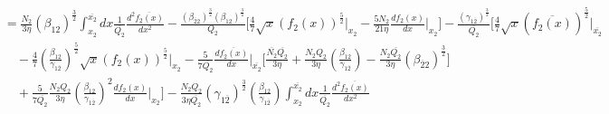 \documentclass[fleqn, 10pt]{article}
\begin{document}
                \begin{equation*}
                \begin{split}
                    &= \frac{N_2}{3 \eta} (\beta_{12})^\frac{3}{2} \int^{\overline{x_{2}}}_{x_2} dx \frac{1}{\overline{Q_{2}}} \frac{d^2\overline{f_{2}(x)}}{dx^2} -  \frac{(\beta_{\overline{2}2})^\frac{3}{2} (\beta_{12})^\frac{3}{2}}{Q_2} \Biggl[ \frac{4}{7} \sqrt{x} (f_2(x))^\frac{5}{2} \Bigg|_{x_2}  -   \frac{5 N_2}{21 \eta} \frac{df_2(x)}{dx} \Bigg|_{x_2} \Biggr] -   \frac{(\gamma_{1\overline{2}})^\frac{3}{2}}{\overline{Q_{2}}} \Biggl[ \frac{4}{7} \sqrt{x} (\overline{f_{2}(x)})^\frac{5}{2} \Bigg|_{\overline{x_{2}}} \\ & \quad -   \frac{4}{7} \left( \frac{\beta_{12}}{\gamma_{1\overline{2}}}\right)^\frac{5}{2} \sqrt{x} (f_2(x))^\frac{5}{2} \Bigg|_{x_2} -  \frac{5}{7\overline{Q_{2}}} \frac{d\overline{f_{2}(x)}}{dx} \Bigg|_{\overline{x_{2}}} \Biggl[\frac{\overline{N_{2}}\overline{Q_{2}}}{3 \eta} + \frac{N_2 Q_2}{3 \eta} \left( \frac{\beta_{12}}{\gamma_{1\overline{2}}}\right) - \frac{N_2 \overline{Q_{2}}}{3 \eta} (\beta_{\overline{2}2})^\frac{3}{2} \Biggr] \\ & \quad +  \frac{5}{7\overline{Q_{2}}} \frac{N_2 Q_2}{3 \eta}\left( \frac{\beta_{12}}{\gamma_{1\overline{2}}}\right)^2 \frac{df_2(x)}{dx} \Bigg|_{x_2} \Biggr] - \frac{N_2 Q_2}{3 \eta \overline{Q_{2}}} (\gamma_{1\overline{2}})^\frac{3}{2} \left( \frac{\beta_{12}}{\gamma_{1\overline{2}}}\right)\int^{\overline{x_{2}}}_{x_2} dx \frac{1}{\overline{Q_{2}}} \frac{d^2\overline{f_{2}(x)}}{dx^2} 
                    \end{split}
                \end{equation*}
\end{document}
